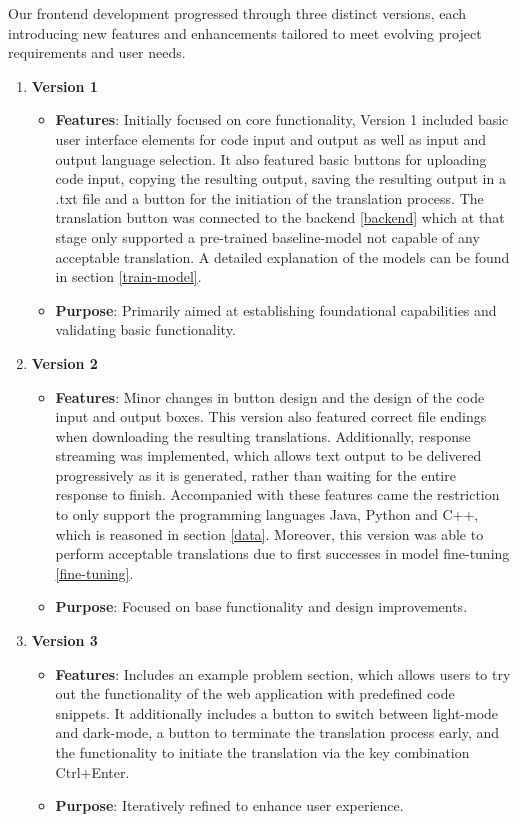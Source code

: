 \documentclass[conference]{IEEEtran}
\begin{document}
Our frontend development progressed through three distinct versions, each introducing new features and enhancements tailored to meet evolving project requirements and user needs.

\begin{enumerate}
    \item \textbf{Version 1}
    \begin{itemize}
        \item \textbf{Features}: Initially focused on core functionality, Version 1 included basic user interface elements for code input and output as well as input and output language selection. It also featured basic buttons for uploading code input, copying the resulting output, saving the resulting output in a .txt file and a button for the initiation of the translation process. The translation button was connected to the backend \ref{backend} which at that stage only supported a pre-trained baseline-model not capable of any acceptable translation. A detailed explanation of the models can be found in section \ref{train-model}.
        \item \textbf{Purpose}: Primarily aimed at establishing foundational capabilities and validating basic functionality.
    \end{itemize}
    
    \item \textbf{Version 2}
    \begin{itemize}
        \item \textbf{Features}: Minor changes in button design and the design of the code input and output boxes. This version also featured correct file endings when downloading the resulting translations. Additionally, response streaming was implemented, which allows text output to be delivered progressively as it is generated, rather than waiting for the entire response to finish. Accompanied with these features came the restriction to only support the programming languages Java, Python and C++, which is reasoned in section \ref{data}. Moreover, this version was able to perform acceptable translations due to first successes in model fine-tuning \ref{fine-tuning}. 
        \item \textbf{Purpose}: Focused on base functionality and design improvements.
    \end{itemize}
    
    \item \textbf{Version 3}
    \begin{itemize}
        \item \textbf{Features}: Includes an example problem section, which allows users to try out the functionality of the web application with predefined code snippets. It additionally includes a button to switch between light-mode and dark-mode, a button to terminate the translation process early, and the functionality to initiate the translation via the key combination Ctrl+Enter.
        \item \textbf{Purpose}: Iteratively refined to enhance user experience.
    \end{itemize}
\end{enumerate}
\end{document}
